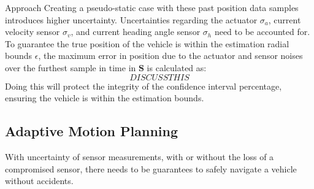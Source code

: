 \begin{section}{Approach}
Creating a pseudo-static case with these past position data samples introduces higher uncertainty. Uncertainties regarding the actuator $\sigma_a$, current velocity sensor $\sigma_v$, and current heading angle sensor $\sigma_h$ need to be accounted for. To guarantee the true position of the vehicle is within the estimation radial bounds $\epsilon$, the maximum error in position due to the actuator and sensor noises over the furthest sample in time in $\mathcal{\bm{S}}$ is calculated as:
    \begin{equation}
	DISCUSS THIS
	\end{equation}
Doing this will protect the integrity of the confidence interval percentage, ensuring the vehicle is within the estimation bounds.


\subsection{Adaptive Motion Planning}
With uncertainty of sensor measurements, with or without the loss of a compromised sensor, there needs to be guarantees to safely navigate a vehicle without accidents.


	




\end{section} 